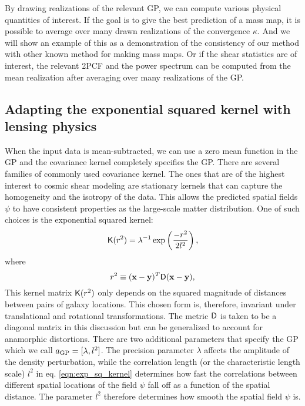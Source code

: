 By drawing realizations of the relevant GP, we can compute various 
physical quantities of interest. If the goal is to give the best prediction of a
mass map, it is possible to average over many drawn realizations of the
convergence $\kappa$. And we will show an example of this as a demonstration of
the consistency of our method with other known method for making mass maps.
Or if the shear statistics are of interest, the relevant 2PCF and the power
spectrum can be computed from the mean realization 
after averaging over many realizations of the GP.

\subsection{Adapting the exponential squared kernel with lensing physics}
When the input data is mean-subtracted, we can use a zero mean function in the
GP and the covariance kernel completely specifies the GP. 
There are several families of commonly used covariance kernel.
The ones that are of the highest interest to cosmic shear modeling 
are stationary kernels that can capture 
the homogeneity and the isotropy of the data. This allows the predicted spatial fields
$\psi$ to have consistent properties as the large-scale matter distribution.
%
One of such choices is the exponential squared kernel: 
\begin{equation}
	\mathsf{K}(r^2) = \lambda^{-1} \exp\left(\frac{-r^2}{2 l^2}\right),
	\label{eqn:exp_sq_kernel}
\end{equation}
where 
\begin{equation}
	r^2 \equiv (\mathbf{x} - \mathbf{y})^T \mathsf{D} (\mathbf{x} - \mathbf{y}), 
\end{equation}
This kernel matrix $\mathsf{K}(r^2)$ only depends on the
squared magnitude of distances between pairs of galaxy locations. 
This chosen form is, therefore, invariant
under translational and rotational transformations.
The metric $\mathsf{D}$ is taken to be a diagonal matrix in this discussion but  
can be generalized to account for anamorphic distortions. There are two
additional parameters that specify the GP which we call $a_{\rm GP} =
[\lambda, l^2]$.
The precision parameter $\lambda$ affects the 
amplitude of the density perturbation, while the correlation length (or
the characteristic length scale) $l^2$ in eq. \ref{eqn:exp_sq_kernel} 
determines how fast the correlations between different spatial locations of the
field $\psi$ fall off as a function of the spatial distance. The parameter
$l^2$ therefore determines how smooth the spatial field $\psi$ is. 

